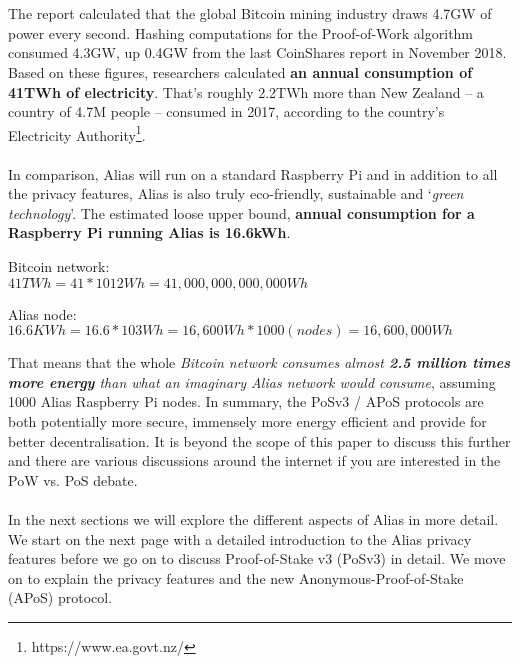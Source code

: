 \\
\\
\noindent
The report calculated that the global Bitcoin mining industry draws 4.7GW of power every second. Hashing computations for the Proof-of-Work algorithm consumed 4.3GW, up 0.4GW from the last CoinShares report in November 2018. Based on these figures, researchers calculated \textbf{an annual consumption of 41TWh of electricity}. That’s roughly 2.2TWh more than New Zealand – a country of 4.7M people – consumed in 2017, according to the country’s Electricity Authority\footnote{https://www.ea.govt.nz/}.
\\
\\
\noindent
In comparison, Alias will run on a standard Raspberry Pi and in addition to all the privacy features, Alias is also truly eco-friendly, sustainable and ‘\textit{green technology}’. The estimated loose upper bound, \textbf{annual 
consumption for a Raspberry Pi running Alias is 16.6kWh}.

\vspace{3mm} %

Bitcoin network:\\
$41 TWh = 41*1012 Wh = 41,000,000,000,000 Wh$

\vspace{3mm} %

Alias node:\\
$16.6 KWh = 16.6 * 103 Wh = 16,600 Wh * 1000 (nodes) = 16,600,000 Wh$

\vspace{3mm} %

\noindent
That means that the whole \textit{Bitcoin network consumes almost \textbf{2.5 million times
more energy} than what an imaginary Alias network would consume}, assuming
1000 Alias Raspberry Pi nodes.
\newpage
\noindent
In summary, the PoSv3 / APoS protocols are both potentially more secure,
immensely more energy efficient and provide for better decentralisation.
It is beyond the scope of this paper to discuss this further and there are
various discussions around the internet if you are interested in the PoW vs.
PoS debate.
\\
\\
\noindent
In the next sections we will explore the different aspects of Alias in
more detail. We start on the next page with a detailed introduction to the
Alias privacy features before we go on to discuss Proof-of-Stake v3
(PoSv3) in detail. We move on to explain the privacy features and the new
Anonymous-Proof-of-Stake (APoS) protocol.